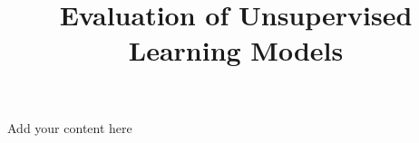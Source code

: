 \title{Evaluation of Unsupervised Learning Models}
\label{chp:evaluation-unsupervised-learning}
\author{}
\institute{}
\maketitle


Add your content here




